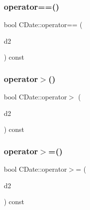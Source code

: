 \mbox{\label{class_c_date_a28a838b34e2d39ce0eb4491c2361baf2}} 
\subsubsection{\texorpdfstring{operator==()}{operator==()}}
{\footnotesize\ttfamily bool C\+Date\+::operator== (\begin{DoxyParamCaption}\item[{const \mbox{\hyperlink{class_c_date}{C\+Date}} \&}]{d2 }\end{DoxyParamCaption}) const}

\mbox{\label{class_c_date_aa85c9b1e8406ba15a19fb2e176392771}} 
\subsubsection{\texorpdfstring{operator$>$()}{operator>()}}
{\footnotesize\ttfamily bool C\+Date\+::operator$>$ (\begin{DoxyParamCaption}\item[{const \mbox{\hyperlink{class_c_date}{C\+Date}} \&}]{d2 }\end{DoxyParamCaption}) const\hspace{0.3cm}{\ttfamily [inline]}}

\mbox{\label{class_c_date_a6737cc09a6d10d7d18f32759b8579ae2}} 
\subsubsection{\texorpdfstring{operator$>$=()}{operator>=()}}
{\footnotesize\ttfamily bool C\+Date\+::operator$>$= (\begin{DoxyParamCaption}\item[{const \mbox{\hyperlink{class_c_date}{C\+Date}} \&}]{d2 }\end{DoxyParamCaption}) const\hspace{0.3cm}{\ttfamily [inline]}}

\mbox{\label{class_c_date_aee82efe856e1ef96400c4d3db2854826}} 
